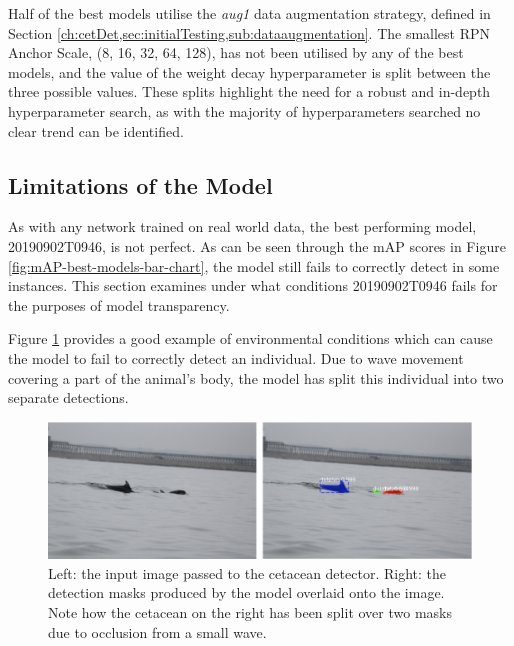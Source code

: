 Half of the best models utilise the \textit{aug1} data augmentation strategy, defined in Section \ref{ch:cetDet,sec:initialTesting,sub:dataaugmentation}. The smallest RPN Anchor Scale, (8, 16, 32, 64, 128), has not been utilised by any of the best models, and the value of the weight decay hyperparameter is split between the three possible values. These splits highlight the need for a robust and in-depth hyperparameter search, as with the majority of hyperparameters searched no clear trend can be identified.

\subsection{Limitations of the Model}\label{ch:cetDet,sec:ModelSelection,sub:LimitationsOfBest}

As with any network trained on real world data, the best performing model, 20190902T0946, is not perfect. As can be seen through the mAP scores in Figure \ref{fig:mAP-best-models-bar-chart}, the model still fails to correctly detect in some instances. This section examines under what conditions 20190902T0946 fails for the purposes of model transparency. 

Figure \ref{fig:model-fail-bad-detection-and-split-individual} provides a good example of environmental conditions which can cause the model to fail to correctly detect an individual. Due to wave movement covering a part of the animal's body, the model has split this individual into two separate detections.

\begin{figure}[h]
	\begin{center}
		\includegraphics[scale=0.6]{Chapter3/figs/model-fail-split-individual.png}
	\end{center}
	\caption[Left: the input image passed to the cetacean detector. Right: the detection masks produced by the model overlaid onto the image.]{Left: the input image passed to the cetacean detector. Right: the detection masks produced by the model overlaid onto the image. Note how the cetacean on the right has been split over two masks due to occlusion from a small wave.}
	\label{fig:model-fail-bad-detection-and-split-individual}
\end{figure}
 
